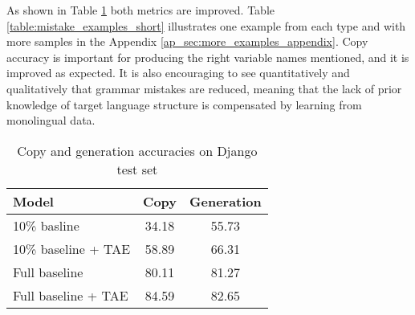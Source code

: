 As shown in Table \ref{table:accuracies} both metrics are improved. Table \ref{table:mistake_examples_short} illustrates one example from each type and with more samples in the Appendix \ref{ap_sec:more_examples_appendix}. Copy accuracy is important for producing the right variable names mentioned, and it is improved as expected. It is also encouraging to see quantitatively and qualitatively that grammar mistakes are reduced, meaning that the lack of prior knowledge of target language structure is compensated by learning from monolingual data.
\begin{table}[h]
    \centering
    \small
    \begin{tabular}{l|c|c}
        \hline
         Model & Copy & Generation \\
         \hline
         10\% basline & 34.18 & 55.73 \\
         10\% baseline + TAE & 58.89 & 66.31 \\
         Full baseline & 80.11 & 81.27 \\
         Full baseline + TAE & 84.59 & 82.65\\
         \hline
    \end{tabular}
\vspace{-0.5em}
    \caption{\label{table:accuracies} {\small Copy and generation accuracies on Django test set} }
\vspace{-1em}
\end{table}














